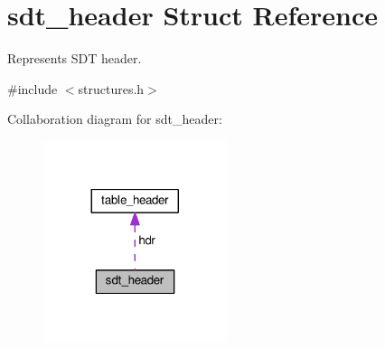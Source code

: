 \hypertarget{structsdt__header}{}\section{sdt\+\_\+header Struct Reference}
\label{structsdt__header}


Represents S\+DT header.  




{\ttfamily \#include $<$structures.\+h$>$}



Collaboration diagram for sdt\+\_\+header\+:\nopagebreak
\begin{figure}[H]
\begin{center}
\leavevmode
\includegraphics[width=152pt]{structsdt__header__coll__graph}
\end{center}
\end{figure}
